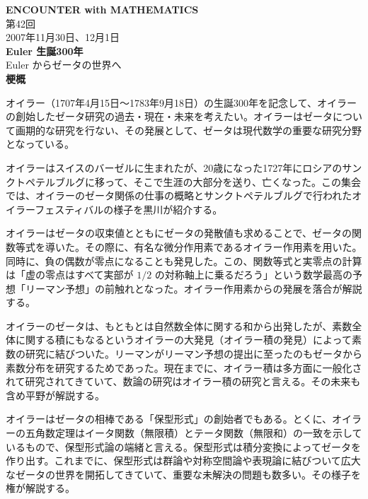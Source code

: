 \documentclass[uplatex,dvipdfmx]{jlreq}
\begin{document}
\begin{center}
  \vspace*{20pt}
  {\Huge\bfseries ENCOUNTER with MATHEMATICS}\\[10pt]
  {\Large 第42回}\\[6pt]
  {\large 2007年11月30日、12月1日}\\[20pt]
  {\Huge\bfseries Euler 生誕300年}\\[6pt]
  {\Large Euler からゼータの世界へ}\\[30pt]
  {\bfseries 梗\qquad 概}
\end{center}

オイラー（1707年4月15日〜1783年9月18日）の生誕300年を記念して、オイラーの創始したゼータ研究の過去・現在・未来を考えたい。オイラーはゼータについて画期的な研究を行ない、その発展として、ゼータは現代数学の重要な研究分野となっている。

オイラーはスイスのバーゼルに生まれたが、20歳になった1727年にロシアのサンクトペテルブルグに移って、そこで生涯の大部分を送り、亡くなった。この集会では、オイラーのゼータ関係の仕事の概略とサンクトペテルブルグで行われたオイラーフェスティバルの様子を黒川が紹介する。

オイラーはゼータの収束値とともにゼータの発散値も求めることで、ゼータの関数等式を導いた。その際に、有名な微分作用素であるオイラー作用素を用いた。同時に、負の偶数が零点になることも発見した。この、関数等式と実零点の計算は「虚の零点はすべて実部が $1/2$ の対称軸上に乗るだろう」という数学最高の予想「リーマン予想」の前触れとなった。オイラー作用素からの発展を落合が解説する。

オイラーのゼータは、もともとは自然数全体に関する和から出発したが、素数全体に関する積にもなるというオイラーの大発見（オイラー積の発見）によって素数の研究に結びついた。リーマンがリーマン予想の提出に至ったのもゼータから素数分布を研究するためであった。現在までに、オイラー積は多方面に一般化されて研究されてきていて、数論の研究はオイラー積の研究と言える。その未来も含め平野が解説する。

オイラーはゼータの相棒である「保型形式」の創始者でもある。とくに、オイラーの五角数定理はイータ関数（無限積）とテータ関数（無限和）の一致を示しているもので、保型形式論の端緒と言える。保型形式は積分変換によってゼータを作り出す。これまでに、保型形式は群論や対称空間論や表現論に結びついて広大なゼータの世界を開拓してきていて、重要な未解決の問題も数多い。その様子を権が解説する。
\end{document}
